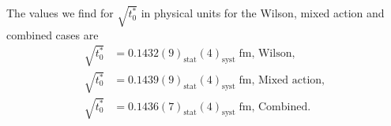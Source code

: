 The values we find for $\sqrt{t_0^*}$ in physical units for the Wilson, mixed action and combined cases are
\begin{align}
\label{ch_ss:eq:t0*}
\sqrt{t_0^*}&=0.1432(9)_{\textrm{stat}}(4)_{\textrm{syst}}\;\textrm{fm, Wilson}, \\
\sqrt{t_0^*}&=0.1439(9)_{\textrm{stat}}(4)_{\textrm{syst}}\;\textrm{fm, Mixed action}, \\
\sqrt{t_0^*}&=0.1436(7)_{\textrm{stat}}(4)_{\textrm{syst}}\;\textrm{fm, Combined}.
\end{align}

